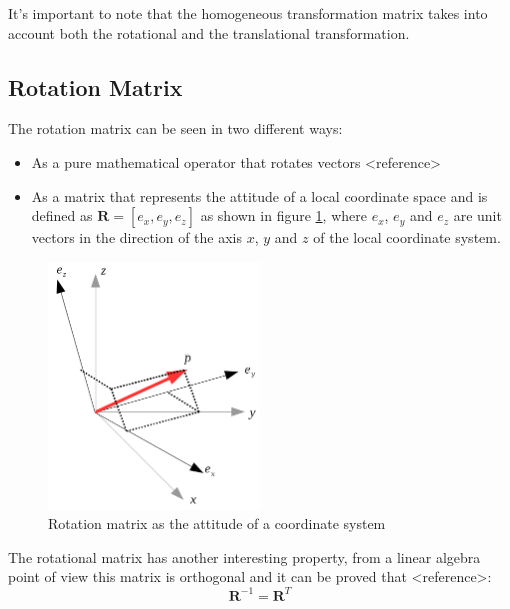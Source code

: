\documentclass[a4paper]{report}
\begin{document}
It's important to note that the homogeneous transformation matrix takes into
account both the rotational and the translational transformation.


\subsection{Rotation Matrix}\label{sub:rotation_matrix}
The rotation matrix can be seen in two different ways:
\begin{itemize}
    \item{} As a pure mathematical operator that rotates vectors <reference>
    \item{} As a matrix that represents the attitude of a local coordinate space
        and is defined as $\boldsymbol{R} = [e_x, e_y, e_z]$ as shown in figure
        \ref{fig:rotation_matrix}, where $e_x$, $e_y$ and $e_z$ are unit vectors
        in the direction of the axis $x$, $y$ and $z$ of the local coordinate
        system.
\end{itemize}

\begin{figure}[htb!]
\begin{center}
    \includegraphics[width=0.5\textwidth]{./resources/rotation_matrix.png}
    \caption{Rotation matrix as the attitude of a coordinate system}
    \label{fig:rotation_matrix}
\end{center}
\end{figure}

The rotational matrix has another interesting property, from a linear algebra
point of view this matrix is orthogonal and it can be proved that <reference>:
\begin{equation}
    \boldsymbol{R}^{-1} = \boldsymbol{R}^{T}
\end{equation}
\end{document}
